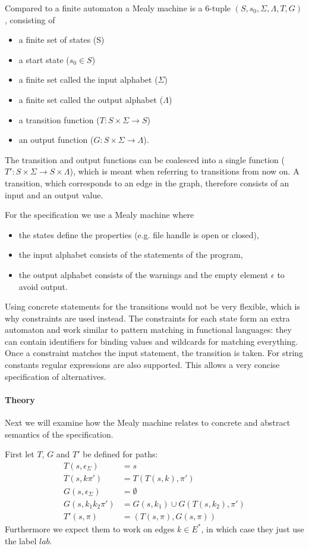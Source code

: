 Compared to a finite automaton a Mealy machine is a 6-tuple $(S, s_0, \Sigma, \Lambda, T, G)$, consisting of
\begin{itemize}
\item a finite set of states (S)
\item a start state ($s_0 \in S$)
\item a finite set called the input alphabet ($\Sigma$)
\item a finite set called the output alphabet ($\Lambda$)
\item a transition function ($T : S \times \Sigma \rightarrow S$)
\item an output function ($G : S \times \Sigma \rightarrow \Lambda$).
\end{itemize}
The transition and output functions can be coalesced into a single function ($T' : S \times \Sigma \rightarrow S \times \Lambda$), which is meant when referring to transitions from now on.
A transition, which corresponds to an edge in the graph, therefore consists of an input and an output value.

For the specification we use a Mealy machine where
\begin{itemize}
\item the states define the properties (e.g. file handle is open or closed),
\item the input alphabet consists of the statements of the program,
\item the output alphabet consists of the warnings and the empty element $\epsilon$ to avoid output.
\end{itemize}
Using concrete statements for the transitions would not be very flexible, which is why constraints are used instead. The constraints for each state form an extra automaton and work similar to pattern matching in functional languages: they can contain identifiers for binding values and wildcards for matching everything. Once a constraint matches the input statement, the transition is taken. For string constants regular expressions are also supported.
This allows a very concise specification of alternatives.

\paragraph*{Theory}
Next we will examine how the Mealy machine relates to concrete and abstract semantics of the specification.

First let $T$, $G$ and $T'$ be defined for paths:
\begin{align}
T(s, \epsilon_\Sigma) &= s\\
T(s, k\pi') &= T(T(s, k), \pi')\\
G(s, \epsilon_\Sigma) &= \emptyset\\
G(s, k_1k_2\pi') &=  G(s, k_1) \cup G(T(s, k_2), \pi')\\
T'(s, \pi) &=  (T(s, \pi), G(s, \pi))
\end{align}
Furthermore we expect them to work on edges $k \in E^*$, in which case they just use the label $lab$.

